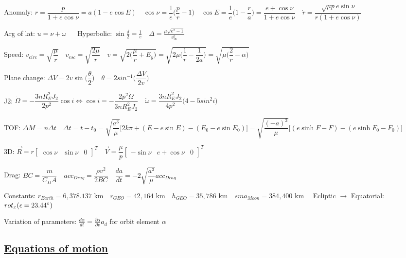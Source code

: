 \documentclass[11pt,landscape]{article}
\begin{document}
Anomaly:
$
r = \dfrac{p}{1+e\cos\nu} = a(1-e\cos E)
\quad
\cos\nu = \dfrac{1}{e} \big( \dfrac{p}{r}-1 \big)
\quad
\cos E = \dfrac{1}{e} \big( 1- \dfrac{r}{a} \big)
= \dfrac{e+\cos\nu}{1+e\cos\nu}
\quad
\dot{r} = \dfrac{\sqrt{\mu p} e \sin\nu}{r(1+e\cos\nu)}
\quad$

Arg of lat: $u = \nu + \omega$
$\quad$
Hyperbolic:
$
\sin \frac{\delta}{2} = \frac{1}{e}
\quad
\Delta = \frac{\mu \sqrt{e^2 - 1}}{v_{\infty}^2}
$

Speed:
$
v_{circ}=\sqrt{\dfrac{\mu}{r}}
\quad
v_{esc}=\sqrt{\dfrac{2\mu}{r}}
\quad
v
= \sqrt{2 \big( \dfrac{\mu}{r} + E_y \big) }
= \sqrt{2\mu \big( \dfrac{1}{r} - \dfrac{1}{2a} \big) }
= \sqrt{\mu \big( \dfrac{2}{r} - \alpha \big) }
$

Plane change:
$
\Delta V = 2 v \sin \big( \dfrac{\theta}{2} \big)
\quad
\theta = 2 sin^{-1} \big( \dfrac{\Delta V}{2v} \big)
$

J2:
$
\dot{\Omega} = - \dfrac{3 n R_E^2 J_2}{2 p^2} \cos i
\Leftrightarrow
\cos i = - \dfrac{2 p^2 \dot{\Omega}}{3 n R_E^2 J_2}
\quad
\dot{\omega} = \dfrac{3 n R_E^2 J_2}{4 p^2} \big( 4 - 5 sin^2 i \big)
$

TOF:
$
\Delta M = n \Delta t
\quad
\Delta t = t - t_0
= \sqrt{\dfrac{a^3}{\mu}} \big[ 2 k \pi + (E-e\sin E) - (E_0-e\sin E_0) \big]
= \sqrt{\dfrac{(-a)^3}{\mu}} \big[ (e\sinh F - F) - (e\sinh F_0 - F_0) \big]
$

3D:
$
\vec{R} = r \begin{bmatrix} \cos\nu & \sin\nu & 0 \end{bmatrix}^T
\quad
\vec{V} = \dfrac{\mu}{p} \begin{bmatrix} -\sin\nu & e+\cos\nu & 0 \end{bmatrix}^T
$

Drag:
$
BC = \dfrac{m}{C_D A}
\quad
acc_{Drag} = \dfrac{\rho v^2}{2 BC}
\quad
\dfrac{da}{dt} = -2 \sqrt{\dfrac{a^3}{\mu}} acc_{Drag}
$

Constants: 
$
r_{Earth} = 6,378.137 $ km$
\quad
r_{GEO} = 42,164 $ km$
\quad
h_{GEO} = 35,786 $ km$
\quad
sma_{Moon} = 384,400 $ km$
\quad
$
Ecliptic $\rightarrow$ Equatorial: $rot_x( \epsilon = 23.44\degree )$


Variation of parameters: 
$\frac{d\alpha}{dt} = \frac{\partial\alpha}{\partial v} a_d$
for orbit element $\alpha$


\newpage
\subsection{\underline{Equations of motion}}
\end{document}
